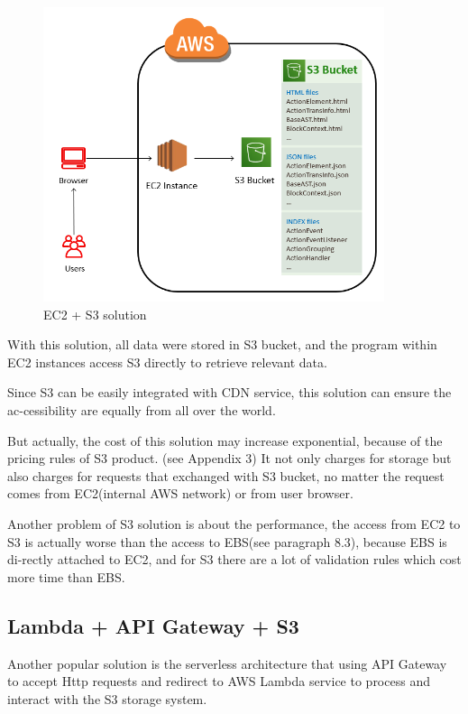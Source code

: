\documentclass[runningheads]{llncs}
\begin{document}
\begin{figure}[H]
	\centering
	\includegraphics[width=10cm]{pic/ec2-s3.png}
	\caption{EC2 + S3 solution}
	\label{EC2 + S3 solution}
\end{figure}

With this solution, all data were stored in S3 bucket, and the program within EC2 instances access S3 directly to retrieve relevant data. 

Since S3 can be easily integrated with CDN service, this solution can ensure the ac-cessibility are equally from all over the world. 

But actually, the cost of this solution may increase exponential, because of the pricing rules of S3 product. (see Appendix 3) It not only charges for storage but also charges for requests that exchanged with S3 bucket, no matter the request comes from EC2(internal AWS network) or from user browser.

Another problem of S3 solution is about the performance, the access from EC2 to S3 is actually worse than the access to EBS(see paragraph 8.3), because EBS is di-rectly attached to EC2, and for S3 there are a lot of validation rules which cost more time than EBS.

\subsection{Lambda + API Gateway + S3}
Another popular solution is the serverless architecture that using API Gateway\cite{api-gateway} to accept Http requests and redirect to AWS Lambda\cite{lambda} service to process and interact with the S3 storage system.
\end{document}
